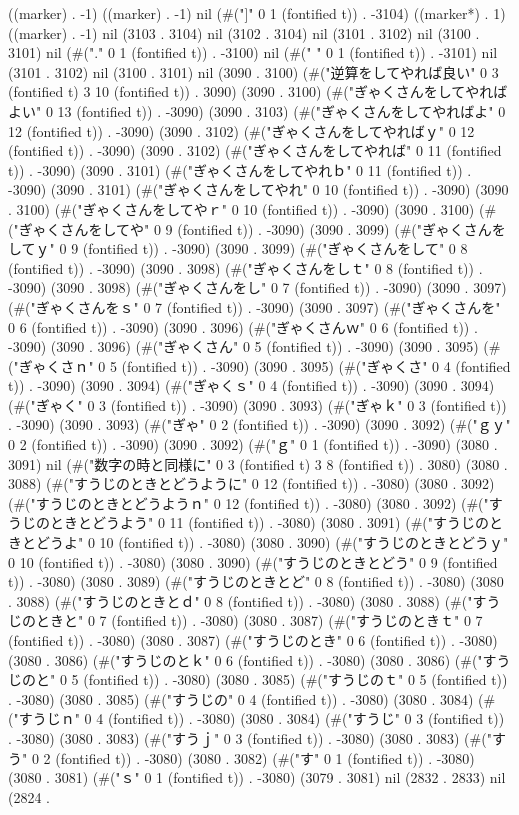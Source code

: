 ((marker) . -1) ((marker) . -1) nil (#("]" 0 1 (fontified t)) . -3104) ((marker*) . 1) ((marker) . -1) nil (3103 . 3104) nil (3102 . 3104) nil (3101 . 3102) nil (3100 . 3101) nil (#("." 0 1 (fontified t)) . -3100) nil (#("
" 0 1 (fontified t)) . -3101) nil (3101 . 3102) nil (3100 . 3101) nil (3090 . 3100) (#("逆算をしてやれば良い" 0 3 (fontified t) 3 10 (fontified t)) . 3090) (3090 . 3100) (#("ぎゃくさんをしてやればよい" 0 13 (fontified t)) . -3090) (3090 . 3103) (#("ぎゃくさんをしてやればよ" 0 12 (fontified t)) . -3090) (3090 . 3102) (#("ぎゃくさんをしてやればｙ" 0 12 (fontified t)) . -3090) (3090 . 3102) (#("ぎゃくさんをしてやれば" 0 11 (fontified t)) . -3090) (3090 . 3101) (#("ぎゃくさんをしてやれｂ" 0 11 (fontified t)) . -3090) (3090 . 3101) (#("ぎゃくさんをしてやれ" 0 10 (fontified t)) . -3090) (3090 . 3100) (#("ぎゃくさんをしてやｒ" 0 10 (fontified t)) . -3090) (3090 . 3100) (#("ぎゃくさんをしてや" 0 9 (fontified t)) . -3090) (3090 . 3099) (#("ぎゃくさんをしてｙ" 0 9 (fontified t)) . -3090) (3090 . 3099) (#("ぎゃくさんをして" 0 8 (fontified t)) . -3090) (3090 . 3098) (#("ぎゃくさんをしｔ" 0 8 (fontified t)) . -3090) (3090 . 3098) (#("ぎゃくさんをし" 0 7 (fontified t)) . -3090) (3090 . 3097) (#("ぎゃくさんをｓ" 0 7 (fontified t)) . -3090) (3090 . 3097) (#("ぎゃくさんを" 0 6 (fontified t)) . -3090) (3090 . 3096) (#("ぎゃくさんｗ" 0 6 (fontified t)) . -3090) (3090 . 3096) (#("ぎゃくさん" 0 5 (fontified t)) . -3090) (3090 . 3095) (#("ぎゃくさｎ" 0 5 (fontified t)) . -3090) (3090 . 3095) (#("ぎゃくさ" 0 4 (fontified t)) . -3090) (3090 . 3094) (#("ぎゃくｓ" 0 4 (fontified t)) . -3090) (3090 . 3094) (#("ぎゃく" 0 3 (fontified t)) . -3090) (3090 . 3093) (#("ぎゃｋ" 0 3 (fontified t)) . -3090) (3090 . 3093) (#("ぎゃ" 0 2 (fontified t)) . -3090) (3090 . 3092) (#("ｇｙ" 0 2 (fontified t)) . -3090) (3090 . 3092) (#("ｇ" 0 1 (fontified t)) . -3090) (3080 . 3091) nil (#("数字の時と同様に" 0 3 (fontified t) 3 8 (fontified t)) . 3080) (3080 . 3088) (#("すうじのときとどうように" 0 12 (fontified t)) . -3080) (3080 . 3092) (#("すうじのときとどうようｎ" 0 12 (fontified t)) . -3080) (3080 . 3092) (#("すうじのときとどうよう" 0 11 (fontified t)) . -3080) (3080 . 3091) (#("すうじのときとどうよ" 0 10 (fontified t)) . -3080) (3080 . 3090) (#("すうじのときとどうｙ" 0 10 (fontified t)) . -3080) (3080 . 3090) (#("すうじのときとどう" 0 9 (fontified t)) . -3080) (3080 . 3089) (#("すうじのときとど" 0 8 (fontified t)) . -3080) (3080 . 3088) (#("すうじのときとｄ" 0 8 (fontified t)) . -3080) (3080 . 3088) (#("すうじのときと" 0 7 (fontified t)) . -3080) (3080 . 3087) (#("すうじのときｔ" 0 7 (fontified t)) . -3080) (3080 . 3087) (#("すうじのとき" 0 6 (fontified t)) . -3080) (3080 . 3086) (#("すうじのとｋ" 0 6 (fontified t)) . -3080) (3080 . 3086) (#("すうじのと" 0 5 (fontified t)) . -3080) (3080 . 3085) (#("すうじのｔ" 0 5 (fontified t)) . -3080) (3080 . 3085) (#("すうじの" 0 4 (fontified t)) . -3080) (3080 . 3084) (#("すうじｎ" 0 4 (fontified t)) . -3080) (3080 . 3084) (#("すうじ" 0 3 (fontified t)) . -3080) (3080 . 3083) (#("すうｊ" 0 3 (fontified t)) . -3080) (3080 . 3083) (#("すう" 0 2 (fontified t)) . -3080) (3080 . 3082) (#("す" 0 1 (fontified t)) . -3080) (3080 . 3081) (#("ｓ" 0 1 (fontified t)) . -3080) (3079 . 3081) nil (2832 . 2833) nil (2824 . 